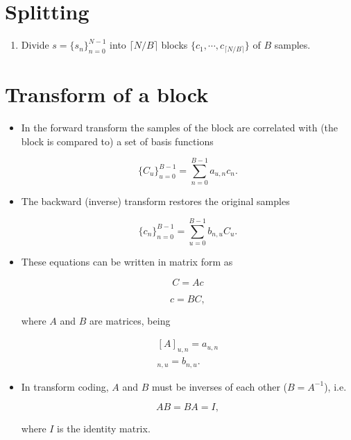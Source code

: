 \section{Splitting}
\begin{enumerate}
\tightlist
\item
  Divide \(s=\{s_n\}_{n=0}^{N-1}\) into \(\lceil N/B \rceil\) blocks
  \(\{c_1, \cdots, c_{\lceil N/B \rceil}\}\) of \(B\) samples.
\end{enumerate}

\section{Transform of a block}
\begin{itemize}
\item
  In the forward transform the samples of the block are correlated with
  (the block is compared to) a set of basis functions

  \begin{equation}
    \{C_u\}_{u=0}^{B-1} = \sum_{n=0}^{B-1}a_{u,n}c_n.
    \tag{forward_transform}
  \end{equation}
\item
  The backward (inverse) transform restores the original samples

  \begin{equation}
    \{c_n\}_{n=0}^{B-1} = \sum_{u=0}^{B-1}b_{n,u}C_u.
    \tag{inverse_transform}
  \end{equation}
\item
  These equations can be written in matrix form as

  \begin{equation}
    C=Ac
    \tag{forward_transform_matrix_form}
  \end{equation}

  \begin{equation}
    c=BC,
    \tag{inverse_transform_matrix_form}
  \end{equation}

  where \(A\) and \(B\) are matrices, being

  \begin{equation}
    \begin{array}{l}
    [A]_{u,n} = a_{u,n} \\
    [B]_{n,u} = b_{n,u}.
    \end{array}
  \end{equation}
\item
  In transform coding, \(A\) and \(B\) must be inverses of each other
  (\(B=A^{-1}\)), i.e.

  \begin{equation}
    AB = BA = I,
  \end{equation}

  where \(I\) is the identity matrix.
\end{itemize}

